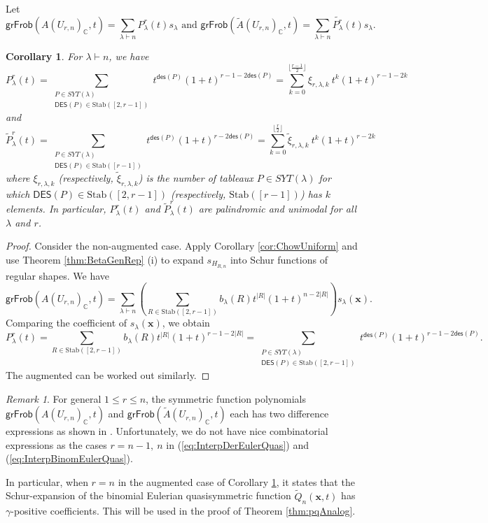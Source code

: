 \documentclass[reqno]{amsart}
\newcommand{\DES}{{\mathsf{DES}}}
\newcommand{\des}{{\mathsf{des}}}
\newcommand{\Stab}{{\mathrm{Stab}}}
\newcommand{\x}{{\mathbf{x}}}
\newcommand{\grFrob}{{\mathsf{grFrob}}}
\newtheorem{cor}[thm]{Corollary}
\theoremstyle{definition}
\theoremstyle{remark}
\newtheorem{rem}{Remark}[section]
\begin{document}
Let
\[
\grFrob(A(U_{r,n})_{\mathbb{C}},t)=\sum_{\lambda\vdash n} P_{\lambda}^r(t)s_{\lambda} \text{ and }\grFrob(\widetilde{A}(U_{r,n})_{\mathbb{C}},t)=\sum_{\lambda\vdash n}\widetilde{P_\lambda^r}(t)s_{\lambda}.
\]
\begin{cor}\label{cor:UniformSchurCoeff}
For $\lambda\vdash n$, we have
\[
    P_{\lambda}^r(t)=\sum_{\substack{P\in SYT(\lambda)\\ \DES(P)\in\Stab([2,r-1])}} t^{\des(P)}(1+t)^{r-1-2\des(P)}=\sum_{k=0}^{\lfloor\frac{r-1}{2}\rfloor}\xi_{r,\lambda,k}~ t^k(1+t)^{r-1-2k}
\]
and 
\[
    \widetilde{P}_{\lambda}^r(t)=\sum_{\substack{P\in SYT(\lambda)\\ \DES(P)\in\Stab([r-1])}} t^{\des(P)}(1+t)^{r-2\des(P)}=\sum_{k=0}^{\lfloor\frac{r}{2}\rfloor}\widetilde{\xi}_{r,\lambda,k}~ t^k(1+t)^{r-2k}
\]
where $\xi_{r,\lambda,k}$ (respectively, $\widetilde{\xi}_{r,\lambda,k}$) is the number of tableaux $P\in SYT(\lambda)$ for which $\DES(P)\in\Stab([2,r-1])$ (respectively, $\Stab([r-1])$) has $k$ elements. In particular, $P_{\lambda}^r(t)$ and $\widetilde{P}_{\lambda}^r(t)$ are palindromic and unimodal for all $\lambda$ and $r$.
\end{cor}
\begin{proof}
Consider the non-augmented case. Apply Corollary \ref{cor:ChowUniform} and use Theorem \ref{thm:BetaGenRep} (i) to expand $s_{H_{R,n}}$ into Schur functions of regular shapes. We have
\[
    \grFrob(A(U_{r,n})_{\mathbb{C}},t)=\sum_{\lambda\vdash n}\left(\sum_{R\in\Stab([2,r-1])}b_{\lambda}(R)t^{|R|}(1+t)^{n-2|R|}\right)s_{\lambda}(\x).
\]
Comparing the coefficient of $s_{\lambda}(\x)$, we obtain
\[
    P_{\lambda}^r(t)=\sum_{R\in\Stab([2,r-1])}b_{\lambda}(R)t^{|R|}(1+t)^{r-1-2|R|}
    =\sum_{\substack{P\in SYT(\lambda)\\ \DES(P)\in\Stab([2,r-1])}}t^{\des(P)}(1+t)^{r-1-2\des(P)}.
\]
The augmented can be worked out similarly. 
\end{proof}

\begin{rem}
For general $1\le r\le n$, the symmetric function polynomials $\grFrob(A(U_{r,n})_{\mathbb{C}},t)$ and $\grFrob(\widetilde{A}(U_{r,n})_{\mathbb{C}},t)$ each has two difference expressions as shown in \cite[Theorem 4.1 and Theorem 4.3]{Liao2023Two}. Unfortunately, we do not have nice combinatorial expressions as the cases $r=n-1,~n$ in  (\ref{eq:InterpDerEulerQuas}) and (\ref{eq:InterpBinomEulerQuas}).   
\end{rem}
In particular, when $r=n$ in the augmented case of Corollary \ref{cor:UniformSchurCoeff}, it states that the Schur-expansion of the binomial Eulerian quasisymmetric function $\widetilde{Q}_n(\x,t)$ has $\gamma$-positive coefficients. This will be used in the proof of Theorem \ref{thm:pqAnalog}.
\end{document}

